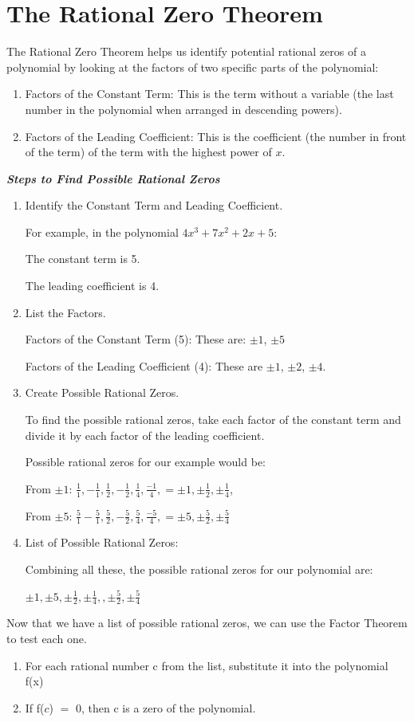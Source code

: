 \section{The Rational Zero Theorem}

The Rational Zero Theorem helps us identify potential rational zeros of a
polynomial by looking at the factors of two specific parts of the polynomial:
\begin{enumerate}
  \item Factors of the Constant Term: This is the term without a variable (the last
  number in the polynomial when arranged in descending powers).
  \item Factors of the Leading Coefficient: This is the coefficient (the number in
  front of the term) of the term with the highest power of $x$.
\end{enumerate}

\noindent\textbf{\textit{Steps to Find Possible Rational Zeros}}
\begin{enumerate}
  \item Identify the Constant Term and Leading Coefficient.

  For example, in the polynomial $4x^3 + 7x^2 + 2x + 5$:

  The constant term is 5.

  The leading coefficient is 4.
  \item List the Factors.

  Factors of the Constant Term (5): These are: $\pm 1$, $\pm 5$

  Factors of the Leading Coefficient (4): These are $\pm 1$, $\pm 2$, $\pm 4$.
  \item Create Possible Rational Zeros.

  To find the possible rational zeros, take each factor of the constant term and
  divide it by each factor of the leading coefficient.

  Possible rational zeros for our example would be:

  From $\pm 1$: $\frac{1}{1}, -\frac{1}{1}, \frac{1}{2}, -\frac{1}{2}, \frac{1}{4},
  \frac{-1}{4}, = \pm 1, \pm\frac{1}{2}, \pm\frac{1}{4}$,

  From $\pm 5$: $\frac{5}{1} - \frac{5}{1}, \frac{5}{2}, -\frac{5}{2}, \frac{5}{4},
  \frac{-5}{4}, = \pm 5, \pm\frac{5}{2}, \pm\frac{5}{4}$
  \item List of Possible Rational Zeros:

  Combining all these, the possible rational zeros for our polynomial are:

  $\pm 1, \pm 5, \pm\frac{1}{2}, \pm\frac{1}{4}, , \pm\frac{5}{2}, \pm\frac{5}{4}$
\end{enumerate}
Now that we have a list of possible rational zeros, we can use the Factor Theorem
to test each one.
\begin{enumerate}
  \item[a.] For each rational number c from the list, substitute it into the polynomial
  f(x)
  \item[b.] If f($c$) $=$ 0, then c is a zero of the polynomial.
\end{enumerate}

